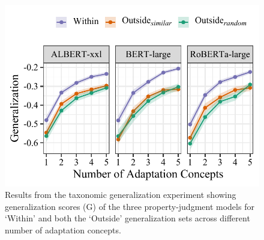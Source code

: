 \documentclass[10pt,letterpaper]{article}
\newcommand{\metric}{\mathrm{G}}
\begin{document}
\begin{figure}[t!]
    \centering
    \includegraphics[width=0.9\columnwidth]{generalization.pdf}
    \vspace{-1em}
    \caption{Results from the taxonomic generalization experiment showing generalization scores ($\metric$) of the three property-judgment models for `Within' and both the `Outside' generalization sets across different number of adaptation concepts.}
    \label{fig:taxonomicresults}
    \vspace{-1.5em}
\end{figure}
\end{document}
